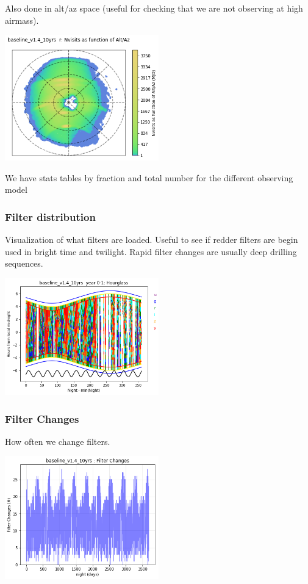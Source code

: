 Also done in alt/az space (useful for checking that we are not observing at high airmass).

\includegraphics[width=0.5\textwidth]{metric_summary/glance/thumb.baseline_v1_4_10yrs_Nvisits_as_function_of_Alt_Az_r_HEAL_SkyMap.png}

We have stats tables by fraction and total number for the different observing model

\subsubsection{Filter distribution}

Visualization of what filters are loaded. Useful to see if redder filters are begin used in bright time and twilight. Rapid filter changes are usually deep drilling sequences.

\includegraphics[width=0.5\textwidth]{metric_summary/glance/thumb.baseline_v1_4_10yrs_Hourglass_year_0-1_HOUR_Hourglass.png}

\subsubsection{Filter Changes}

How often we change filters.

\includegraphics[width=0.5\textwidth]{metric_summary/glance/thumb.baseline_v1_4_10yrs_Filter_Changes_ONED_BinnedData.png}

